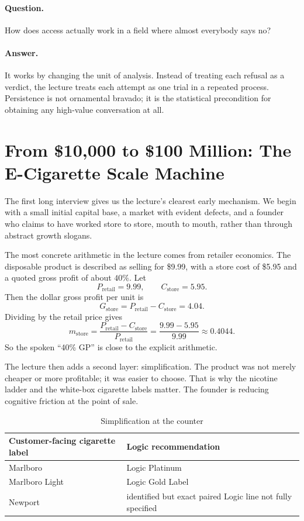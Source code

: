 \paragraph{Question.} How does access actually work in a field where almost everybody says no?

\paragraph{Answer.} It works by changing the unit of analysis. Instead of treating each refusal as a verdict, the lecture treats each attempt as one trial in a repeated process. Persistence is not ornamental bravado; it is the statistical precondition for obtaining any high-value conversation at all.

\section{From \$10{,}000 to \$100 Million: The E-Cigarette Scale Machine}

The first long interview gives us the lecture's clearest early mechanism. We begin with a small initial capital base, a market with evident defects, and a founder who claims to have worked store to store, mouth to mouth, rather than through abstract growth slogans.

The most concrete arithmetic in the lecture comes from retailer economics. The disposable product is described as selling for \$9.99, with a store cost of \$5.95 and a quoted gross profit of about \(40\%\). Let
\[
P_{\mathrm{retail}}=9.99,\qquad C_{\mathrm{store}}=5.95.
\]
Then the dollar gross profit per unit is
\begin{equation}
G_{\mathrm{store}}=P_{\mathrm{retail}}-C_{\mathrm{store}}=4.04.
\end{equation}
Dividing by the retail price gives
\begin{equation}
m_{\mathrm{store}}=\frac{P_{\mathrm{retail}}-C_{\mathrm{store}}}{P_{\mathrm{retail}}}
=\frac{9.99-5.95}{9.99}\approx 0.4044.
\end{equation}
So the spoken ``40\% GP'' is close to the explicit arithmetic.

The lecture then adds a second layer: simplification. The product was not merely cheaper or more profitable; it was easier to choose. That is why the nicotine ladder and the white-box cigarette labels matter. The founder is reducing cognitive friction at the point of sale.

\begin{table}[h]
\centering
\caption{Simplification at the counter}
\begin{tabular}{|l|l|}
\hline
Customer-facing cigarette label & Logic recommendation \\
\hline
Marlboro & Logic Platinum \\
Marlboro Light & Logic Gold Label \\
Newport & identified but exact paired Logic line not fully specified \\
\hline
\end{tabular}
\end{table}


